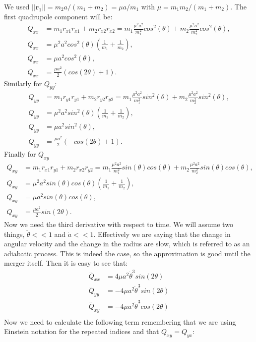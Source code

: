 \noindent We used $||\textbf{r}_1||= m_2 a/(m_1+m_2)=\mu a/m_1$ with $\mu=m_1 m_2 /(m_1+m_2)$.
\noindent The first quadrupole component will be:
\begin{align}
    Q_{xx}&=m_1r_{x1}r_{x1}+m_2r_{x2}r_{x2}=m_1\frac{\mu^2 a^2}{m_1^2}cos^2(\theta)+m_2\frac{\mu^2 a^2}{m_2^2}cos^2(\theta),\\
    Q_{xx}&=\mu^2 a^2cos^2(\theta)(\frac{1}{m_1}+\frac{1}{m_2}),\\
    Q_{xx}&=\mu a^2cos^2(\theta),\\
    Q_{xx}&=\frac{\mu a^2}{2}(cos(2\theta)+1).
\end{align}
\noindent Similarly for $Q_{yy}$:
\begin{align}
    Q_{yy}&=m_1r_{y1}r_{y1}+m_2r_{y2}r_{y2}=m_1\frac{\mu^2 a^2}{m_1^2}sin^2(\theta)+m_2\frac{\mu^2 a^2}{m_2^2}sin^2(\theta),\\
    Q_{yy}&=\mu^2 a^2sin^2(\theta)(\frac{1}{m_1}+\frac{1}{m_2}),\\
    Q_{yy}&=\mu a^2sin^2(\theta),\\
    Q_{yy}&=\frac{\mu a^2}{2}(-cos(2\theta)+1).
\end{align}
\noindent Finally for $Q_{xy}$
\begin{align}
    Q_{xy}&=m_1r_{x1}r_{y1}+m_2r_{x2}r_{y2}=m_1\frac{\mu^2 a^2}{m_1^2}sin(\theta)cos(\theta)+m_2\frac{\mu^2 a^2}{m_2^2}sin(\theta)cos(\theta),\\
    Q_{xy}&=\mu^2 a^2sin(\theta)cos(\theta)(\frac{1}{m_1}+\frac{1}{m_2}),\\
    Q_{xy}&=\mu a^2sin(\theta)cos(\theta),\\
    Q_{xy}&=\frac{\mu a^2}{2}sin(2\theta).
\end{align}
\noindent Now we need the third derivative with respect to time. 
We will assume two things, $\ddot\theta<<1$ and $\dot a<<1$.
Effectively we are saying that the change in angular velocity and the change in the radius are slow, which is referred to as an adiabatic process. 
This is indeed the case, so the approximation is good until the merger itself.
Then it is easy to see that:
\begin{align}
    \dddot Q_{xx}&=4\mu a^2\dot\theta^3sin(2\theta)\\
    \dddot Q_{yy}&=-4\mu a^2\dot\theta^3sin(2\theta)\\
    \dddot Q_{xy}&=-4\mu a^2\dot\theta^3cos(2\theta)\\
\end{align}
Now we need to calculate the following term remembering that we are using Einstein notation for the repeated indices and that $Q_{xy}=Q_{yx}$:
